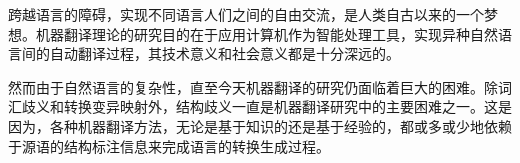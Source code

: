 跨越语言的障碍，实现不同语言人们之间的自由交流，是人类自古以来的一个梦想。机器翻译理论的研究目的在于应用计算机作为智能处理工具，实现异种自然语言间的自动翻译过程，其技术意义和社会意义都是十分深远的。

然而由于自然语言的复杂性，直至今天机器翻译的研究仍面临着巨大的困难。除词汇歧义和转换变异映射外，结构歧义一直是机器翻译研究中的主要困难之一。这是因为，各种机器翻译方法，无论是基于知识的还是基于经验的，都或多或少地依赖于源语的结构标注信息来完成语言的转换生成过程。


